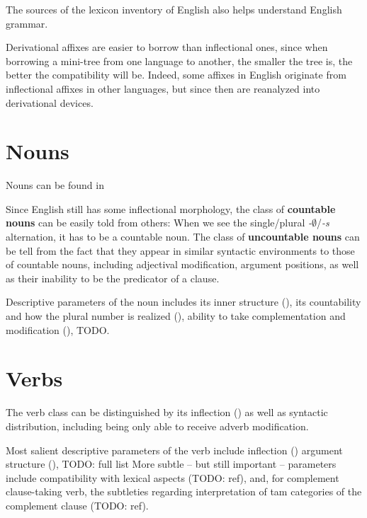 \documentclass[UTF8, a4paper, oneside, scheme=plain, 12pt]{ctexbook}
\newcommand*{\concept}[1]{\textbf{#1}}
\newcommand{\form}[1]{\emph{#1}}
\newcommand{\emptymorpheme}{$\emptyset$}
\begin{document}
The sources of the lexicon inventory of English 
also helps understand English grammar.


Derivational affixes are easier to borrow than inflectional ones, 
since when borrowing a mini-tree from one language to another, 
the smaller the tree is, 
the better the compatibility will be. 
Indeed, some affixes in English originate from inflectional affixes in other languages, 
but since then are reanalyzed into derivational devices.

\section{Nouns}\label{sec:pos.noun}

Nouns can be found in 

Since English still has some inflectional morphology,
the class of \concept{countable nouns} can be easily told from others:
When we see the single/plural \form{-\emptymorpheme}/\form{-s} alternation, 
it has to be a countable noun.
The class of \concept{uncountable nouns} can be tell from 
the fact that they appear in similar syntactic environments 
to those of countable nouns,
including adjectival modification,
argument positions,
as well as their inability to be the predicator of a clause.

Descriptive parameters of the noun includes 
its inner structure (), 
its countability and how the plural number is realized (),
ability to take complementation and modification (), TODO.



\section{Verbs}\label{sec:pos.verb}

The verb class can be distinguished by its inflection ()
as well as syntactic distribution,
including being only able to receive adverb modification. 

Most salient descriptive parameters of the verb include
inflection ()
argument structure (),
TODO: full list
More subtle -- but still important -- parameters 
include compatibility with lexical aspects (TODO: ref), 
and, for complement clause-taking verb,
the subtleties regarding interpretation of \ac{tam} categories 
of the complement clause (TODO: ref).
\end{document}
